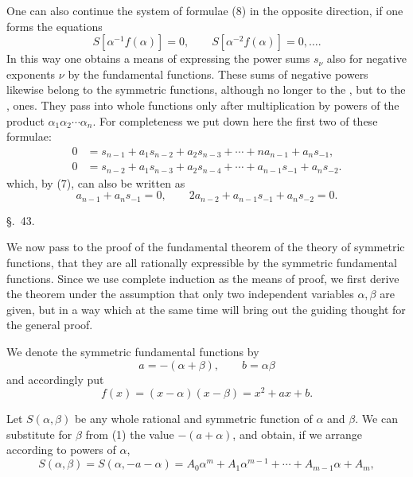 
One can also continue the system of formulae (8) in the opposite direction, if one forms the equations
\[
 S[\alpha^{-1}f(\alpha)]=0,\qquad
 S[\alpha^{-2}f(\alpha)]=0,\ldots .
\]
In this way one obtains a means of expressing the power sums $s_\nu$ also for negative exponents $\nu$ by the fundamental functions. These sums of negative powers likewise belong to the symmetric functions, although no longer to the , but to the , ones. They pass into whole functions only after multiplication by powers of the product $\alpha_1\alpha_2\cdots\alpha_n$. For completeness we put down here the first two of these formulae:
\begin{equation}
\begin{aligned}
0&=s_{n-1}+a_1s_{n-2}+a_2s_{n-3}+\cdots+n a_{n-1}+a_ns_{-1},\\
0&=s_{n-2}+a_1s_{n-3}+a_2s_{n-4}+\cdots+a_{n-1}s_{-1}+a_ns_{-2}.
\end{aligned}
\tag{11}
\end{equation}
which, by (7), can also be written as
\[
 a_{n-1}+a_ns_{-1}=0,\qquad 2a_{n-2}+a_{n-1}s_{-1}+a_ns_{-2}=0.
\]

\begin{center}
{\large \S.\ 43.}

\vspace{0.5em}
{\large{}}
\end{center}

We now pass to the proof of the fundamental theorem of the theory of symmetric functions, that they are all rationally expressible by the symmetric fundamental functions. Since we use complete induction as the means of proof, we first derive the theorem under the assumption that only two independent variables $\alpha,\beta$ are given, but in a way which at the same time will bring out the guiding thought for the general proof.

We denote the symmetric fundamental functions by
\begin{equation}
 a=-(\alpha+\beta),\qquad b=\alpha\beta
\tag{1}
\end{equation}
and accordingly put
\begin{equation}
 f(x)=(x-\alpha)(x-\beta)=x^2+ax+b.
\tag{2}
\end{equation}

Let $S(\alpha,\beta)$ be any whole rational and symmetric function of $\alpha$ and $\beta$. We can substitute for $\beta$ from (1) the value $-(a+\alpha)$, and obtain, if we arrange according to powers of $\alpha$,
\begin{equation}
 S(\alpha,\beta)=S(\alpha,-a-\alpha)=A_0\alpha^m+A_1\alpha^{m-1}+\cdots+A_{m-1}\alpha+A_m,
\tag{3}
\end{equation}
